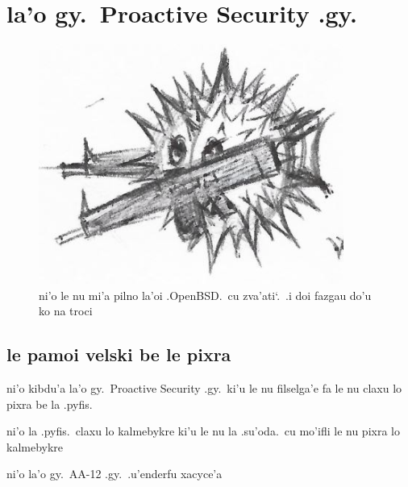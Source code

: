 \documentclass{report}
\newcommand\sds{\spacefactor\sfcode`.\ \space}
\begin{document}
\chapter{la'o gy.\ Proactive Security .gy.}
\begin{figure}[ht]
	\centering
	\includegraphics[width=10cm]{proactivesecurity/proactivesecurity.png}
	\caption[center]{ni'o le nu mi'a pilno la'oi .OpenBSD.\ cu zva'ati\sds  .i doi fazgau do'u ko na troci}
\end{figure}
\section{le pamoi velski be le pixra}
ni'o kibdu'a la'o gy.\ Proactive Security .gy.\ ki'u le nu filselga'e fa le nu claxu lo pixra be la .pyfis.

ni'o la .pyfis.\ claxu lo kalmebykre ki'u le nu la .su'oda.\ cu mo'ifli le nu pixra lo kalmebykre

ni'o la'o gy.\ AA-12 .gy.\ .u'enderfu xacyce'a
\end{document}
